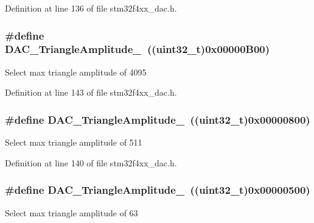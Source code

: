 Definition at line 136 of file stm32f4xx\-\_\-dac.\-h.

\hypertarget{group___d_a_c__lfsrunmask__triangleamplitude_ga3ce69f5a63a2464dc4b5f73cb6fe72f5}{
\subsubsection[{D\-A\-C\-\_\-\-Triangle\-Amplitude\-\_\-4095}]{\setlength{\rightskip}{0pt plus 5cm}\#define D\-A\-C\-\_\-\-Triangle\-Amplitude\-\_~((uint32\-\_\-t)0x00000\-B00)}}\label{group___d_a_c__lfsrunmask__triangleamplitude_ga3ce69f5a63a2464dc4b5f73cb6fe72f5}
Select max triangle amplitude of 4095 

Definition at line 143 of file stm32f4xx\-\_\-dac.\-h.

\hypertarget{group___d_a_c__lfsrunmask__triangleamplitude_ga565b0c97bbdf152756617d491bf8ef85}{
\subsubsection[{D\-A\-C\-\_\-\-Triangle\-Amplitude\-\_\-511}]{\setlength{\rightskip}{0pt plus 5cm}\#define D\-A\-C\-\_\-\-Triangle\-Amplitude\-\_~((uint32\-\_\-t)0x00000800)}}\label{group___d_a_c__lfsrunmask__triangleamplitude_ga565b0c97bbdf152756617d491bf8ef85}
Select max triangle amplitude of 511 

Definition at line 140 of file stm32f4xx\-\_\-dac.\-h.

\hypertarget{group___d_a_c__lfsrunmask__triangleamplitude_gaaae92dae9c4da55e29c645396825e36b}{
\subsubsection[{D\-A\-C\-\_\-\-Triangle\-Amplitude\-\_\-63}]{\setlength{\rightskip}{0pt plus 5cm}\#define D\-A\-C\-\_\-\-Triangle\-Amplitude\-\_~((uint32\-\_\-t)0x00000500)}}\label{group___d_a_c__lfsrunmask__triangleamplitude_gaaae92dae9c4da55e29c645396825e36b}
Select max triangle amplitude of 63 

